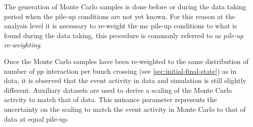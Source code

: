 The generation of Monte Carlo samples is done before or during the data taking
period when the pile-up conditions are not yet known. For this reason at the
analysis level it is necessary to re-weight the \gls{mc} pile-up conditions to
what is found during the data taking, this procedure is commonly referred to as
\emph{pile-up re-weighting}.
\begin{description}[font=\normalfont]
\item[syst\_PRW\_DATASF:] Once the Monte Carlo samples have been re-weighted to
  the same distribution of number of $pp$ interaction per bunch crossing (see
  \cref{sec:initial-final-state}) as in data, it is observed that the event
  activity in data and simulation is still slightly different. Auxiliary
  datasets are used to derive a scaling of the Monte Carlo activity to match
  that of data. This nuisance parameter represents the uncertainty on the
  scaling to match the event activity in Monte Carlo to that of data at equal
  pile-up.
\end{description}
